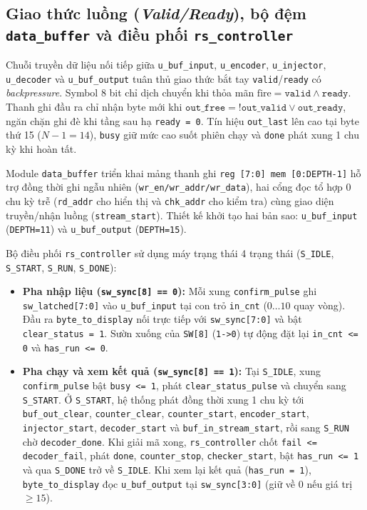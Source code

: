 \subsection*{Giao thức luồng (\textit{Valid/Ready}), bộ đệm \texttt{data\_buffer} và điều phối \texttt{rs\_controller}}
Chuỗi truyền dữ liệu nối tiếp giữa \texttt{u\_buf\_input}, \texttt{u\_encoder}, \texttt{u\_injector}, \texttt{u\_decoder} và \texttt{u\_buf\_output} tuân thủ giao thức bắt tay \texttt{valid}/\texttt{ready} có \textit{backpressure}. Symbol 8 bit chỉ dịch chuyển khi thỏa mãn $\text{fire} = \texttt{valid} \wedge \texttt{ready}$. Thanh ghi đầu ra chỉ nhận byte mới khi $\texttt{out\_free} = \texttt{!out\_valid} \vee \texttt{out\_ready}$, ngăn chặn ghi đè khi tầng sau hạ \texttt{ready = 0}. Tín hiệu \texttt{out\_last} lên cao tại byte thứ 15 ($N-1 = 14$), \texttt{busy} giữ mức cao suốt phiên chạy và \texttt{done} phát xung 1 chu kỳ khi hoàn tất.

Module \texttt{data\_buffer} triển khai mảng thanh ghi \texttt{reg [7:0] mem [0:DEPTH-1]} hỗ trợ đồng thời ghi ngẫu nhiên (\texttt{wr\_en/wr\_addr/wr\_data}), hai cổng đọc tổ hợp 0 chu kỳ trễ (\texttt{rd\_addr} cho hiển thị và \texttt{chk\_addr} cho kiểm tra) cùng giao diện truyền/nhận luồng (\texttt{stream\_start}). Thiết kế khởi tạo hai bản sao: \texttt{u\_buf\_input} (\texttt{DEPTH=11}) và \texttt{u\_buf\_output} (\texttt{DEPTH=15}).

Bộ điều phối \texttt{rs\_controller} sử dụng máy trạng thái 4 trạng thái (\texttt{S\_IDLE}, \texttt{S\_START}, \texttt{S\_RUN}, \texttt{S\_DONE}):
\begin{itemize}
    \item \textbf{Pha nhập liệu (\texttt{sw\_sync[8] == 0}):} Mỗi xung \texttt{confirm\_pulse} ghi \texttt{sw\_latched[7:0]} vào \texttt{u\_buf\_input} tại con trỏ \texttt{in\_cnt} ($0\dots 10$ quay vòng). Đầu ra \texttt{byte\_to\_display} nối trực tiếp với \texttt{sw\_sync[7:0]} và bật \texttt{clear\_status = 1}. Sườn xuống của \texttt{SW[8]} (\texttt{1->0}) tự động đặt lại \texttt{in\_cnt <= 0} và \texttt{has\_run <= 0}.
    \item \textbf{Pha chạy và xem kết quả (\texttt{sw\_sync[8] == 1}):} Tại \texttt{S\_IDLE}, xung \texttt{confirm\_pulse} bật \texttt{busy <= 1}, phát \texttt{clear\_status\_pulse} và chuyển sang \texttt{S\_START}. Ở \texttt{S\_START}, hệ thống phát đồng thời xung 1 chu kỳ tới \texttt{buf\_out\_clear}, \texttt{counter\_clear}, \texttt{counter\_start}, \texttt{encoder\_start}, \texttt{injector\_start}, \texttt{decoder\_start} và \texttt{buf\_in\_stream\_start}, rồi sang \texttt{S\_RUN} chờ \texttt{decoder\_done}. Khi giải mã xong, \texttt{rs\_controller} chốt \texttt{fail <= decoder\_fail}, phát \texttt{done}, \texttt{counter\_stop}, \texttt{checker\_start}, bật \texttt{has\_run <= 1} và qua \texttt{S\_DONE} trở về \texttt{S\_IDLE}. Khi xem lại kết quả (\texttt{has\_run = 1}), \texttt{byte\_to\_display} đọc \texttt{u\_buf\_output} tại \texttt{sw\_sync[3:0]} (giữ về 0 nếu giá trị $\ge 15$).
\end{itemize}

